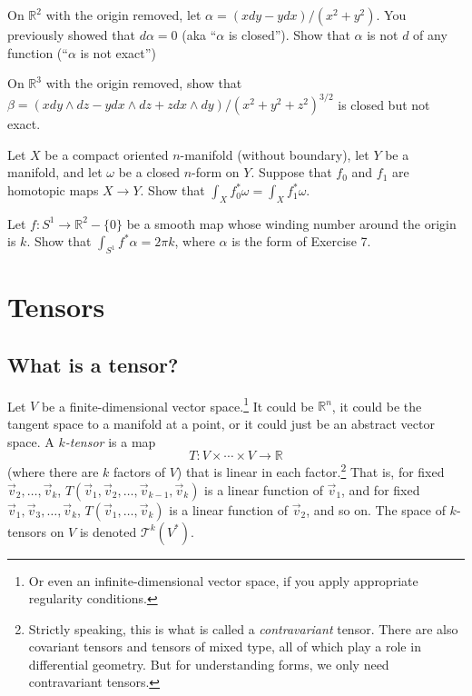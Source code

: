 \documentclass[12pt]{amsbook}
\newcommand{\T}{{\mathcal T}}
\newcommand{\R}{{\mathbb R}}
\theoremstyle{definition}
\begin{document}
\smallskip

 On $\R^2$ with the origin removed, let 
$\alpha = (x dy - y dx)/(x^2+y^2)$. You previously showed that $d\alpha=0$
(aka ``$\alpha$ is closed''). Show that $\alpha$ is not $d$ of any function
(``$\alpha$ is not exact'')

\smallskip

 On $\R^3$ with the origin removed, show that 
$\beta = (x dy \wedge dz - y dx \wedge dz + z dx \wedge dy)/(x^2+y^2+z^2)^{3/2}$
is closed but not exact. 

\smallskip

 Let $X$ be a compact oriented $n$-manifold (without
boundary), let $Y$
be a manifold, and let $\omega$ be a closed $n$-form on $Y$. 
Suppose that $f_0$ and $f_1$ are homotopic maps $X \to Y$. Show that $\int_X
f_0^*\omega = \int_X f_1^* \omega$. 

\smallskip

 Let $f: S^1 \to \R^2-\{0\}$ be a smooth map
whose winding number around the origin is $k$. Show that 
$\int_{S^1} f^* \alpha = 2\pi k$, where $\alpha$ is the form of Exercise 7.

\chapter{Tensors}

\section{What is a tensor?}

Let $V$ be a finite-dimensional vector 
space.\footnote{Or even an infinite-dimensional vector space, if you apply 
appropriate regularity conditions.}
 It could be $\R^n$, it 
could be the tangent
space to a manifold at a point, or it could just be an abstract vector
space. A {\em $k$-tensor} is a map 
$$T: V \times \cdots \times V \to \R$$
(where there are $k$ factors of $V$) that is linear in each factor.\footnote{Strictly speaking, 
this is what is called a {\em contravariant} tensor. There are also
covariant tensors and tensors of mixed type, all of which play a role in differential geometry. 
But for understanding forms, we only need contravariant tensors.}
That is, for fixed $\vec v_2,\ldots, \vec v_k$, 
$T(\vec v_1,\vec v_2,\ldots, \vec v_{k-1}, \vec v_k)$ is a linear function of $\vec v_1$, and for 
fixed $\vec v_1,\vec v_3,\ldots, \vec v_k$, $T(\vec v_1,\ldots, \vec v_k)$ is a linear function of 
$\vec v_2$, and so on. The space of $k$-tensors on $V$ is denoted $\T^k(V^*)$.
\end{document}
